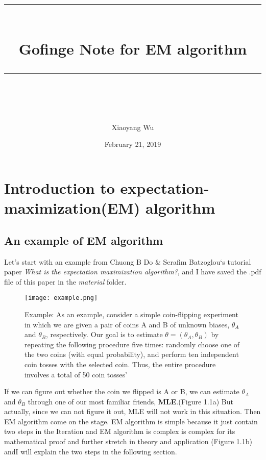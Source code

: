 \documentclass[11pt]{scrartcl} %
\title{	
	\normalfont\normalsize
	\rule{\linewidth}{0.5pt}\\ %
	\vspace{20pt} %
	{\huge Gofinge Note for EM algorithm}\\ %
	\vspace{12pt} %
	\rule{\linewidth}{2pt}\\ %
	\vspace{12pt} %
}
\author{\LARGE Xiaoyang Wu} %
\date{\normalsize February 21, 2019} %
\begin{document}
\maketitle %


\section{Introduction to expectation-maximization(EM)  algorithm}

\subsection{An example of EM algorithm}

Let's start with an example from Chuong B Do \& Serafim Batzoglou‘s tutorial paper \textit{What is the expectation maximization algorithm?}, and I have saved the .pdf file of this paper in the \textit{material} folder.

\begin{figure}[h] %
	\centering
	\texttt{[image: example.png]} %
	\caption{Example: As an example, consider a simple coin-flipping experiment in which we are given a pair of coins A and B of unknown biases, $\theta_A$ and $\theta_B$, respectively. Our goal is to estimate $\theta = (\theta_A, \theta_B)$ by repeating the following procedure five times: randomly choose one of the two coins (with equal probability), and perform ten independent coin tosses with the selected coin. Thus, the entire procedure involves a total of 50 coin tosses'}
\end{figure}

If we can figure out whether the coin we flipped is A or B, we can estimate $\theta_A$ and $\theta_B$ through one of our most familiar friends, \textbf{MLE}.(Figure 1.1a) But actually, since we can not figure it out, MLE will not work in this situation. Then EM algorithm come on the stage. EM algorithm is simple because it just contain two steps in the Iteration and EM algorithm is complex is complex for its mathematical proof and further stretch in theory and application (Figure 1.1b) andI will explain the two steps in the following section.
\end{document}
